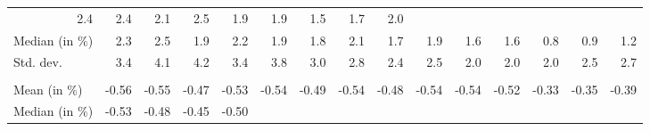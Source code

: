 \begin{tabular}{lllllllllllllll}
  \multicolumn{1}{r}{2.4} &
  \multicolumn{1}{r}{2.4} &
  \multicolumn{1}{r}{2.1} &
  \multicolumn{1}{r}{2.5} &
  \multicolumn{1}{r}{1.9} &
  \multicolumn{1}{r}{1.9} &
  \multicolumn{1}{r}{1.5} &
  \multicolumn{1}{r}{1.7} &
  \multicolumn{1}{r}{2.0} \\
\multicolumn{1}{l}{\hspace{2em}Median (in $\%$)} &
  \multicolumn{1}{|r}{2.3} &
  \multicolumn{1}{r}{2.5} &
  \multicolumn{1}{r}{1.9} &
  \multicolumn{1}{r}{2.2} &
  \multicolumn{1}{r}{1.9} &
  \multicolumn{1}{r}{1.8} &
  \multicolumn{1}{r}{2.1} &
  \multicolumn{1}{r}{1.7} &
  \multicolumn{1}{r}{1.9} &
  \multicolumn{1}{r}{1.6} &
  \multicolumn{1}{r}{1.6} &
  \multicolumn{1}{r}{0.8} &
  \multicolumn{1}{r}{0.9} &
  \multicolumn{1}{r}{1.2} \\
\multicolumn{1}{l}{\hspace{2em}Std. dev.} &
  \multicolumn{1}{|r}{3.4} &
  \multicolumn{1}{r}{4.1} &
  \multicolumn{1}{r}{4.2} &
  \multicolumn{1}{r}{3.4} &
  \multicolumn{1}{r}{3.8} &
  \multicolumn{1}{r}{3.0} &
  \multicolumn{1}{r}{2.8} &
  \multicolumn{1}{r}{2.4} &
  \multicolumn{1}{r}{2.5} &
  \multicolumn{1}{r}{2.0} &
  \multicolumn{1}{r}{2.0} &
  \multicolumn{1}{r}{2.0} &
  \multicolumn{1}{r}{2.5} &
  \multicolumn{1}{r}{2.7} \\
\multicolumn{1}{l}{\hspace{1em}{\textit{Elasticity} ($\widehat{\beta}$)}} &
  \multicolumn{1}{|r}{} &
  \multicolumn{1}{r}{} &
  \multicolumn{1}{r}{} &
  \multicolumn{1}{r}{} &
  \multicolumn{1}{r}{} &
  \multicolumn{1}{r}{} &
  \multicolumn{1}{r}{} &
  \multicolumn{1}{r}{} &
  \multicolumn{1}{r}{} &
  \multicolumn{1}{r}{} &
  \multicolumn{1}{r}{} &
  \multicolumn{1}{r}{} &
  \multicolumn{1}{r}{} &
  \multicolumn{1}{r}{} \\
\multicolumn{1}{l}{\hspace{2em}Mean (in $\%$)} &
  \multicolumn{1}{|r}{-0.56} &
  \multicolumn{1}{r}{-0.55} &
  \multicolumn{1}{r}{-0.47} &
  \multicolumn{1}{r}{-0.53} &
  \multicolumn{1}{r}{-0.54} &
  \multicolumn{1}{r}{-0.49} &
  \multicolumn{1}{r}{-0.54} &
  \multicolumn{1}{r}{-0.48} &
  \multicolumn{1}{r}{-0.54} &
  \multicolumn{1}{r}{-0.54} &
  \multicolumn{1}{r}{-0.52} &
  \multicolumn{1}{r}{-0.33} &
  \multicolumn{1}{r}{-0.35} &
  \multicolumn{1}{r}{-0.39} \\
\multicolumn{1}{l}{\hspace{2em}Median (in $\%$)} &
  \multicolumn{1}{|r}{-0.53} &
  \multicolumn{1}{r}{-0.48} &
  \multicolumn{1}{r}{-0.45} &
  \multicolumn{1}{r}{-0.50} &

\end{tabular}

